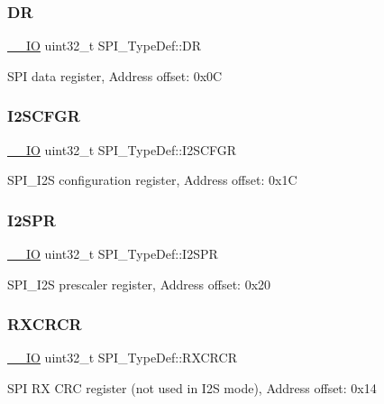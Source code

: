 \subsubsection{\texorpdfstring{DR}{DR}}
{\footnotesize\ttfamily \mbox{\hyperlink{core__sc300_8h_aec43007d9998a0a0e01faede4133d6be}{\+\_\+\+\_\+\+IO}} uint32\+\_\+t S\+P\+I\+\_\+\+Type\+Def\+::\+DR}

S\+PI data register, Address offset\+: 0x0C \mbox{\label{struct_s_p_i___type_def_a4a1547c0ed26f31108910c35d2876b83}} 
\subsubsection{\texorpdfstring{I2SCFGR}{I2SCFGR}}
{\footnotesize\ttfamily \mbox{\hyperlink{core__sc300_8h_aec43007d9998a0a0e01faede4133d6be}{\+\_\+\+\_\+\+IO}} uint32\+\_\+t S\+P\+I\+\_\+\+Type\+Def\+::\+I2\+S\+C\+F\+GR}

S\+P\+I\+\_\+\+I2S configuration register, Address offset\+: 0x1C \mbox{\label{struct_s_p_i___type_def_aff2f386a2566c722f7962377b495f1a2}} 
\subsubsection{\texorpdfstring{I2SPR}{I2SPR}}
{\footnotesize\ttfamily \mbox{\hyperlink{core__sc300_8h_aec43007d9998a0a0e01faede4133d6be}{\+\_\+\+\_\+\+IO}} uint32\+\_\+t S\+P\+I\+\_\+\+Type\+Def\+::\+I2\+S\+PR}

S\+P\+I\+\_\+\+I2S prescaler register, Address offset\+: 0x20 \mbox{\label{struct_s_p_i___type_def_a60f1f0e77c52e89cfd738999bee5c9d0}} 
\subsubsection{\texorpdfstring{RXCRCR}{RXCRCR}}
{\footnotesize\ttfamily \mbox{\hyperlink{core__sc300_8h_aec43007d9998a0a0e01faede4133d6be}{\+\_\+\+\_\+\+IO}} uint32\+\_\+t S\+P\+I\+\_\+\+Type\+Def\+::\+R\+X\+C\+R\+CR}

S\+PI RX C\+RC register (not used in I2S mode), Address offset\+: 0x14 \mbox{\label{struct_s_p_i___type_def_a33f3dd6a505d06fe6c466b63be451891}} 

